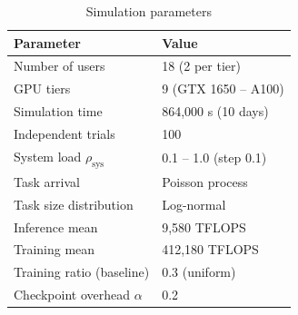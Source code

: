 \begin{table}[tb]
\centering
\caption{Simulation parameters}
\label{tab:sim_params}
\begin{tabular}{ll}
\hline
Parameter & Value \\ \hline
Number of users & 18 (2 per tier) \\
GPU tiers & 9 (GTX 1650 -- A100) \\
Simulation time & 864,000 s (10 days) \\
Independent trials & 100 \\
System load $\rho_\mathrm{sys}$ & 0.1 -- 1.0 (step 0.1) \\
Task arrival & Poisson process \\
Task size distribution & Log-normal \\
Inference mean & 9,580 TFLOPS \\
Training mean & 412,180 TFLOPS \\
Training ratio (baseline) & 0.3 (uniform) \\
Checkpoint overhead $\alpha$ & 0.2 \\ \hline
\end{tabular}
\end{table}


